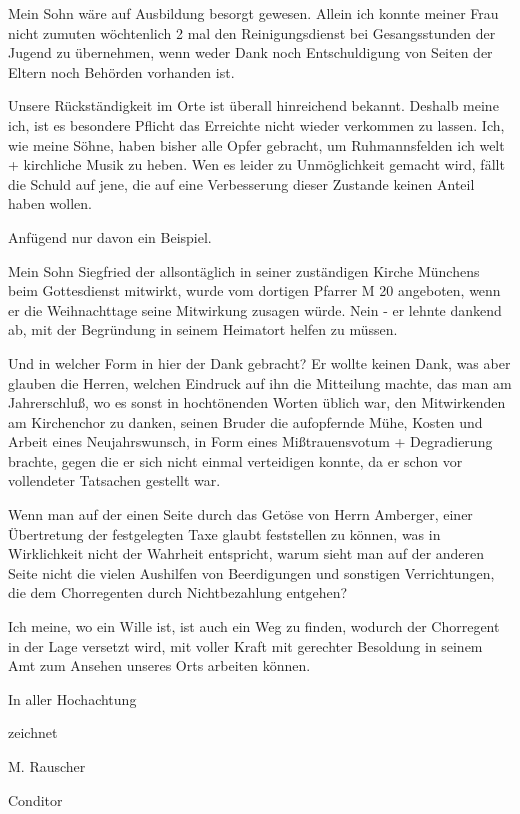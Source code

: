 \documentclass[12pt,a4paper]{book}
\begin{document}
Mein Sohn wäre auf Ausbildung besorgt gewesen. Allein ich konnte meiner Frau
nicht zumuten wöchtenlich 2 mal den Reinigungsdienst bei Gesangsstunden der
Jugend zu übernehmen, wenn weder Dank noch Entschuldigung von Seiten der Eltern
noch Behörden vorhanden ist.

Unsere Rückständigkeit im Orte ist überall hinreichend bekannt. Deshalb meine
ich, ist es besondere Pflicht das Erreichte nicht wieder verkommen zu lassen.
Ich, wie meine Söhne, haben bisher alle Opfer gebracht, um Ruhmannsfelden ich
welt + kirchliche Musik zu heben. Wen es leider zu Unmöglichkeit gemacht wird,
fällt die Schuld auf jene, die auf eine Verbesserung dieser Zustande keinen
Anteil haben wollen.

Anfügend nur davon ein Beispiel.

Mein Sohn Siegfried der allsontäglich in seiner zuständigen Kirche Münchens beim
Gottesdienst mitwirkt, wurde vom dortigen Pfarrer M 20 angeboten, wenn er die
Weihnachttage seine Mitwirkung zusagen würde. Nein - er lehnte dankend ab, mit
der Begründung in seinem Heimatort helfen zu müssen.

Und in welcher Form in hier der Dank gebracht? Er wollte keinen Dank, was aber
glauben die Herren, welchen Eindruck auf ihn die Mitteilung machte, das man am
Jahrerschluß, wo es sonst in hochtönenden Worten üblich war, den Mitwirkenden am
Kirchenchor zu danken, seinen Bruder die aufopfernde Mühe, Kosten und Arbeit
eines Neujahrswunsch, in Form eines Mißtrauensvotum + Degradierung brachte,
gegen die er sich nicht einmal verteidigen konnte, da er schon vor vollendeter
Tatsachen gestellt war.

Wenn man auf der einen Seite durch das Getöse von Herrn Amberger, einer
Übertretung der festgelegten Taxe glaubt feststellen zu können, was in
Wirklichkeit nicht der Wahrheit entspricht, warum sieht man auf der anderen
Seite nicht die vielen Aushilfen von Beerdigungen und sonstigen Verrichtungen,
die dem Chorregenten durch Nichtbezahlung entgehen?

Ich meine, wo ein Wille ist, ist auch ein Weg zu finden, wodurch der Chorregent
in der Lage versetzt wird, mit voller Kraft mit gerechter Besoldung in seinem
Amt zum Ansehen unseres Orts arbeiten können.



    In aller Hochachtung

        zeichnet

        M. Rauscher

            Conditor
\end{document}
